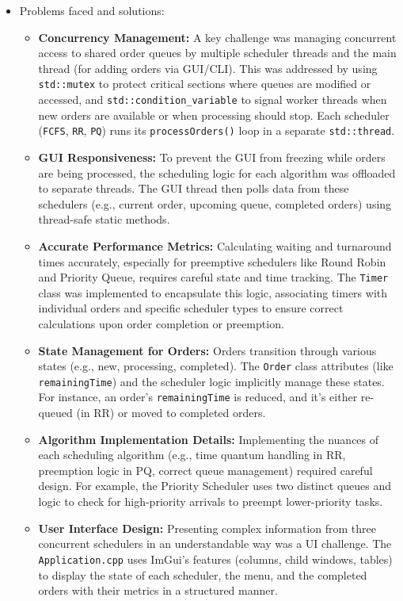 \documentclass[a4paper,12pt]{article}
\begin{document}
\begin{itemize}
\begin{itemize}
\begin{itemize}
                \end{itemize}
        \end{itemize}
    \item Problems faced and solutions:
        \begin{itemize}
            \item \textbf{Concurrency Management:} A key challenge was managing concurrent access to shared order queues by multiple scheduler threads and the main thread (for adding orders via GUI/CLI). This was addressed by using \nolinkurl{std::mutex} to protect critical sections where queues are modified or accessed, and \nolinkurl{std::condition_variable} to signal worker threads when new orders are available or when processing should stop. Each scheduler (\nolinkurl{FCFS}, \nolinkurl{RR}, \nolinkurl{PQ}) runs its \nolinkurl{processOrders()} loop in a separate \nolinkurl{std::thread}.
            \item \textbf{GUI Responsiveness:} To prevent the GUI from freezing while orders are being processed, the scheduling logic for each algorithm was offloaded to separate threads. The GUI thread then polls data from these schedulers (e.g., current order, upcoming queue, completed orders) using thread-safe static methods.
            \item \textbf{Accurate Performance Metrics:} Calculating waiting and turnaround times accurately, especially for preemptive schedulers like Round Robin and Priority Queue, requires careful state and time tracking. The \nolinkurl{Timer} class was implemented to encapsulate this logic, associating timers with individual orders and specific scheduler types to ensure correct calculations upon order completion or preemption.
            \item \textbf{State Management for Orders:} Orders transition through various states (e.g., new, processing, completed). The \nolinkurl{Order} class attributes (like \nolinkurl{remainingTime}) and the scheduler logic implicitly manage these states. For instance, an order's \nolinkurl{remainingTime} is reduced, and it's either re-queued (in RR) or moved to completed orders.
            \item \textbf{Algorithm Implementation Details:} Implementing the nuances of each scheduling algorithm (e.g., time quantum handling in RR, preemption logic in PQ, correct queue management) required careful design. For example, the Priority Scheduler uses two distinct queues and logic to check for high-priority arrivals to preempt lower-priority tasks.
            \item \textbf{User Interface Design:} Presenting complex information from three concurrent schedulers in an understandable way was a UI challenge. The \nolinkurl{Application.cpp} uses ImGui's features (columns, child windows, tables) to display the state of each scheduler, the menu, and the completed orders with their metrics in a structured manner.
        \end{itemize}
\end{itemize}
\newpage
\end{document}
